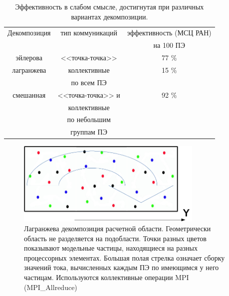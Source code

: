\begin{table}[ht]
\begin{center}
\caption{Эффективность в слабом смысле, достигнутая при различных вариантах декомпозиции.}
\begin{tabular}{|c|c|c|}
\hline
Декомпозиция & тип коммуникаций        &  эффективность (МСЦ РАН) \\
             &                         &  на 100 ПЭ\\ \hline
эйлерова     & <<точка-точка>>         &   77 \%  \\ \hline
 лагранжева  & коллективные            &   15 \%  \\
             &  по всем ПЭ             &        \\ \hline
 смешанная   & <<точка-точка>> и       &   92 \%  \\ 
             & коллективные            &       \\
             & по небольшим            &        \\ 
             & группам ПЭ              &      \\ \hline 
\end{tabular}
\end{center}
\end{table}


\begin{figure}[ht]
	\begin{center}
		\includegraphics[height=4cm,keepaspectratio]{images/decomp_Lag.png}
	\end{center}
	\caption{Лагранжева декомпозиция расчетной области. Геометрически область не разделяется на подобласти. Точки разных цветов показывают модельные частицы, находящиеся на разных процессорных  элементах. Большая полая стрелка означает сборку значений тока, вычисленных каждым ПЭ по имеющимся у него частицам. Используются коллективные операции MPI (MPI\_Allreduce)}
	\label{Euler_dec}
\end{figure}







